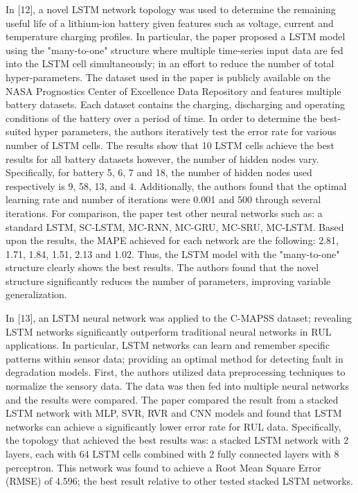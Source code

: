 \documentclass[journal]{IEEEtran}
\begin{document}
In [12], a novel LSTM network topology was used to determine the remaining useful life of a lithium-ion battery given features such as voltage, current and temperature charging profiles. In particular, the paper proposed a LSTM model using the "many-to-one" structure where multiple time-series input data are fed into the LSTM cell simultaneously; in an effort to reduce the number of total hyper-parameters. The dataset used in the paper is publicly available on the NASA Prognostics Center of Excellence Data Repository and features multiple battery datasets. Each dataset contains the charging, discharging and operating conditions of the battery over a period of time. In order to determine the best-suited hyper parameters, the authors iteratively test the error rate for various number of LSTM cells. The results show that 10 LSTM cells achieve the best results for all battery datasets however, the number of hidden nodes vary. Specifically, for battery 5, 6, 7 and 18, the number of hidden nodes used respectively is 9, 58, 13, and 4. Additionally, the authors found that the optimal learning rate and number of iterations were 0.001 and 500 through several iterations. For comparison, the paper test other neural networks such as: a standard LSTM, SC-LSTM, MC-RNN, MC-GRU, MC-SRU, MC-LSTM. Based upon the results, the MAPE achieved for each network are the following: 2.81, 1.71, 1.84, 1.51, 2.13 and 1.02. Thus, the LSTM model with the "many-to-one" structure clearly shows the best results. The authors found that the novel structure significantly reduces the number of parameters, improving variable generalization.  

In [13], an LSTM neural network was applied to the C-MAPSS dataset; revealing LSTM networks significantly outperform traditional neural networks in RUL applications. In particular, LSTM networks can learn and remember specific patterns within sensor data; providing an optimal method for detecting fault in degradation models. First, the authors utilized data preprocessing techniques to normalize the sensory data. The data was then fed into multiple neural networks and the results were compared. The paper compared the result from a stacked LSTM network with MLP, SVR, RVR and CNN models and found that LSTM networks can achieve a significantly lower error rate for RUL data. Specifically, the topology that achieved the best results was: a stacked LSTM network with 2 layers, each with 64 LSTM cells combined with 2 fully connected layers with 8 perceptron. This network was found to achieve a Root Mean Square Error (RMSE) of 4.596; the best result relative to other tested stacked LSTM networks. 
\end{document}
